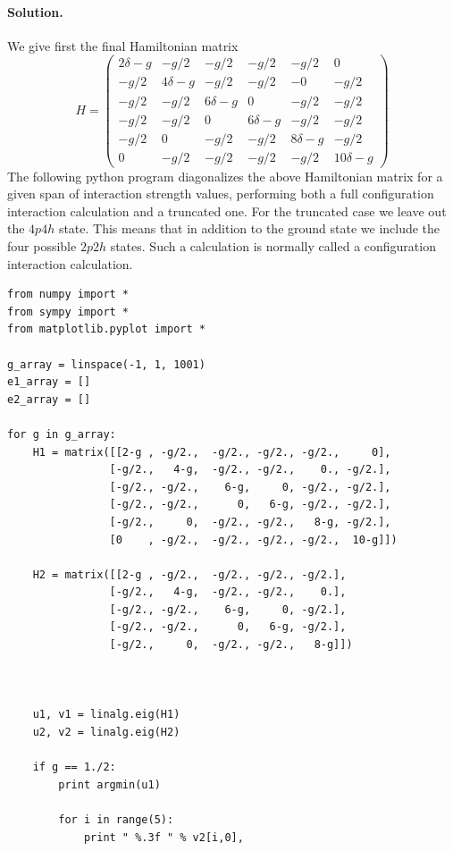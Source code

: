 \documentclass[%
twoside,                 %
final,                   %
10pt]{article}
\newenvironment{doconceexercise}{}{}
\begin{document}
\begin{doconceexercise}
\paragraph{Solution.}
We give first the final Hamiltonian matrix
\[
H = \left ( 
\begin{array}{cccccc}
2\delta -g & -g/2 & -g/2 & -g/2 & -g/2 & 0 \\
 -g/2 & 4\delta -g & -g/2 & -g/2 & -0 & -g/2 \\
-g/2 & -g/2 & 6\delta -g & 0 & -g/2 & -g/2 \\
 -g/2 & -g/2 & 0 & 6\delta-g & -g/2 & -g/2 \\
 -g/2 & 0 & -g/2 & -g/2 & 8\delta-g & -g/2 \\
0 & -g/2 & -g/2 & -g/2 & -g/2 & 10\delta -g 
\end{array} \right )
\]
The following python program diagonalizes the above Hamiltonian matrix for a given span of interaction strength values, performing both a full configuration interaction calculation and a truncated one. For the truncated case we leave out the $4p4h$ state. This means that in addition to the ground state we include the four possible $2p2h$ states. Such a calculation is normally called a configuration interaction calculation. 
\begin{verbatim}
from numpy import *
from sympy import *
from matplotlib.pyplot import *

g_array = linspace(-1, 1, 1001)
e1_array = []
e2_array = []

for g in g_array:
	H1 = matrix([[2-g , -g/2.,  -g/2., -g/2., -g/2.,     0], 
		        [-g/2.,   4-g,  -g/2., -g/2.,    0., -g/2.],
		        [-g/2., -g/2.,    6-g,     0, -g/2., -g/2.],
				[-g/2., -g/2.,      0,   6-g, -g/2., -g/2.],
				[-g/2.,     0,  -g/2., -g/2.,   8-g, -g/2.],
				[0    , -g/2.,  -g/2., -g/2., -g/2.,  10-g]]) 

	H2 = matrix([[2-g , -g/2.,  -g/2., -g/2., -g/2.], 
		        [-g/2.,   4-g,  -g/2., -g/2.,    0.],
		        [-g/2., -g/2.,    6-g,     0, -g/2.],
				[-g/2., -g/2.,      0,   6-g, -g/2.],
				[-g/2.,     0,  -g/2., -g/2.,   8-g]]) 

		

	u1, v1 = linalg.eig(H1)
	u2, v2 = linalg.eig(H2)

	if g == 1./2:
		print argmin(u1)

		for i in range(5):
			print " %.3f " % v2[i,0],




\end{verbatim}
\end{doconceexercise}
\end{document}
